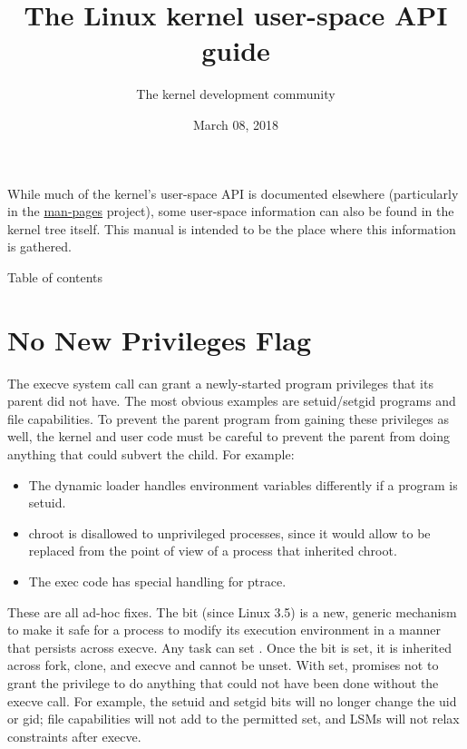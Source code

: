 \documentclass[a4paper,8pt,english]{sphinxmanual}
\title{The Linux kernel user-space API guide}
\date{March 08, 2018}
\author{The kernel development community}
\begin{document}
\maketitle
\tableofcontents
{}\label{userspace-api/index::doc}


While much of the kernel's user-space API is documented elsewhere
(particularly in the \href{https://www.kernel.org/doc/man-pages/}{man-pages} project), some user-space information can
also be found in the kernel tree itself.  This manual is intended to be the
place where this information is gathered.

Table of contents


\chapter{No New Privileges Flag}
\label{userspace-api/no_new_privs::doc}\label{userspace-api/no_new_privs:no-new-privileges-flag}\label{userspace-api/no_new_privs:the-linux-kernel-user-space-api-guide}
The execve system call can grant a newly-started program privileges that
its parent did not have.  The most obvious examples are setuid/setgid
programs and file capabilities.  To prevent the parent program from
gaining these privileges as well, the kernel and user code must be
careful to prevent the parent from doing anything that could subvert the
child.  For example:
\begin{itemize}
\item {} 
The dynamic loader handles  environment variables differently if
a program is setuid.

\item {} 
chroot is disallowed to unprivileged processes, since it would allow
 to be replaced from the point of view of a process that
inherited chroot.

\item {} 
The exec code has special handling for ptrace.

\end{itemize}

These are all ad-hoc fixes.  The  bit (since Linux 3.5) is a
new, generic mechanism to make it safe for a process to modify its
execution environment in a manner that persists across execve.  Any task
can set .  Once the bit is set, it is inherited across fork,
clone, and execve and cannot be unset.  With  set, 
promises not to grant the privilege to do anything that could not have
been done without the execve call.  For example, the setuid and setgid
bits will no longer change the uid or gid; file capabilities will not
add to the permitted set, and LSMs will not relax constraints after
execve.
\end{document}
